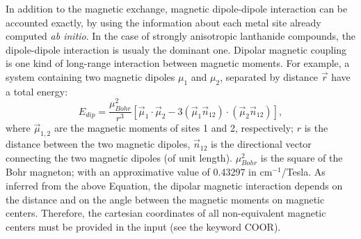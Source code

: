 In addition to the magnetic exchange, magnetic dipole-dipole interaction can be accounted exactly, by
using the information about each metal site already computed \textit{ab initio}. In the case of
strongly anisotropic lanthanide compounds, the dipole-dipole interaction is usualy the dominant
one. Dipolar magnetic coupling is one kind of long-range interaction between magnetic moments.
For example, a system containing two magnetic dipoles $\mu_{1}$ and $\mu_{2}$, separated by
distance $\vec r$ have a total energy:
\begin{equation}
E_{dip} = \frac{\mu_{Bohr}^{2}}{ r^{3}} [\vec\mu_{1} \cdot \vec\mu_{2} - 3(\vec \mu_{1} \vec n_{12})\cdot (\vec \mu_{2} \vec n_{12})],
\end{equation}
where $\vec\mu_{1,2}$ are the magnetic moments of sites 1 and 2, respectively; $r$ is the distance between
the two magnetic dipoles, $\vec n_{12}$ is the directional vector connecting the two magnetic dipoles (of unit length).
$\mu_{Bohr}^{2}$ is the square of the Bohr magneton; with an approximative value of 0.43297 in cm$^{-1}$/Tesla.
As inferred from the above Equation, the dipolar magnetic interaction depends on the distance and on the angle between the magnetic moments on magnetic
centers. Therefore, the cartesian coordinates of all non-equivalent magnetic centers must be provided in the input (see the keyword COOR).





